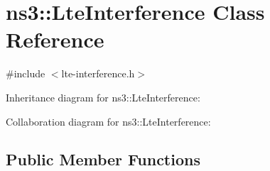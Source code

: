 \hypertarget{classns3_1_1LteInterference}{}\section{ns3\+:\+:Lte\+Interference Class Reference}
\label{classns3_1_1LteInterference}


{\ttfamily \#include $<$lte-\/interference.\+h$>$}



Inheritance diagram for ns3\+:\+:Lte\+Interference\+:


Collaboration diagram for ns3\+:\+:Lte\+Interference\+:
\subsection*{Public Member Functions}
